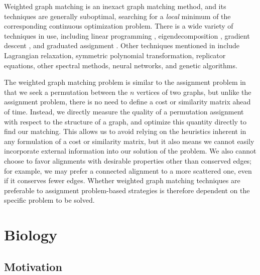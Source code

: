 \documentclass[12pt]{thesis}
\theoremstyle{plain}
\theoremstyle{definition}
\theoremstyle{remark}
\begin{document}
Weighted graph matching is an inexact graph matching method, and its techniques are generally suboptimal, searching for a \textit{local} minimum of the corresponding continuous optimization problem. There is a wide variety of techniques in use, including linear programming \cite{Almohamad_1993}, eigendecomposition \cite{Umeyama_1988}, gradient descent \cite{Koutra_2013}, and graduated assignment \cite{Gold_1996}. Other techniques mentioned in \cite{Almohamad_1993, Umeyama_1988, Gold_1996, Conte_2004} include Lagrangian relaxation, symmetric polynomial transformation, replicator equations, other spectral methods, neural networks, and genetic algorithms.

The weighted graph matching problem is similar to the assignment problem in that we seek a permutation between the $n$ vertices of two graphs, but unlike the assignment problem, there is no need to define a cost or similarity matrix ahead of time. Instead, we directly measure the quality of a permutation assignment with respect to the structure of a graph, and optimize this quantity directly to find our matching. This allows us to avoid relying on the heuristics inherent in any formulation of a cost or similarity matrix, but it also means we cannot easily incorporate external information into our solution of the problem. We also cannot choose to favor alignments with desirable properties other than conserved edges; for example, we may prefer a connected alignment to a more scattered one, even if it conserves fewer edges. Whether weighted graph matching techniques are preferable to assignment problem-based strategies is therefore dependent on the specific problem to be solved. 
















\chapter{Biology}\label{chapter:systems_biology}

\section{Motivation}
\end{document}
